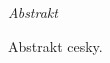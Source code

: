 \vfill
\begin{center}
{\it \large Abstrakt}
\vspace{0.2cm}

\begin{minipage}{0.8\textwidth}{
Abstrakt cesky.
}
\end{minipage}
\end{center}
\vfill
\vspace{1cm}
\newpage{}
